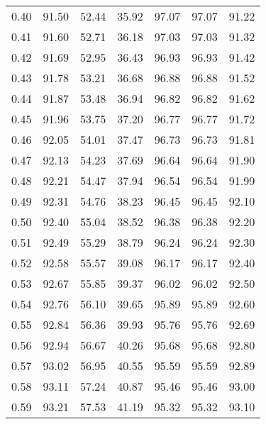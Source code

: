 \begin{tabular}{|c|c|c|c|c|c|c|}
      0.40 &     91.50 &     52.44 &      35.92 &   97.07 &      97.07 &         91.22 \\
      0.41 &     91.60 &     52.71 &      36.18 &   97.03 &      97.03 &         91.32 \\
      0.42 &     91.69 &     52.95 &      36.43 &   96.93 &      96.93 &         91.42 \\
      0.43 &     91.78 &     53.21 &      36.68 &   96.88 &      96.88 &         91.52 \\
      0.44 &     91.87 &     53.48 &      36.94 &   96.82 &      96.82 &         91.62 \\
      0.45 &     91.96 &     53.75 &      37.20 &   96.77 &      96.77 &         91.72 \\
      0.46 &     92.05 &     54.01 &      37.47 &   96.73 &      96.73 &         91.81 \\
      0.47 &     92.13 &     54.23 &      37.69 &   96.64 &      96.64 &         91.90 \\
      0.48 &     92.21 &     54.47 &      37.94 &   96.54 &      96.54 &         91.99 \\
      0.49 &     92.31 &     54.76 &      38.23 &   96.45 &      96.45 &         92.10 \\
      0.50 &     92.40 &     55.04 &      38.52 &   96.38 &      96.38 &         92.20 \\
      0.51 &     92.49 &     55.29 &      38.79 &   96.24 &      96.24 &         92.30 \\
      0.52 &     92.58 &     55.57 &      39.08 &   96.17 &      96.17 &         92.40 \\
      0.53 &     92.67 &     55.85 &      39.37 &   96.02 &      96.02 &         92.50 \\
      0.54 &     92.76 &     56.10 &      39.65 &   95.89 &      95.89 &         92.60 \\
      0.55 &     92.84 &     56.36 &      39.93 &   95.76 &      95.76 &         92.69 \\
      0.56 &     92.94 &     56.67 &      40.26 &   95.68 &      95.68 &         92.80 \\
      0.57 &     93.02 &     56.95 &      40.55 &   95.59 &      95.59 &         92.89 \\
      0.58 &     93.11 &     57.24 &      40.87 &   95.46 &      95.46 &         93.00 \\
      0.59 &     93.21 &     57.53 &      41.19 &   95.32 &      95.32 &         93.10 \\

\end{tabular}
